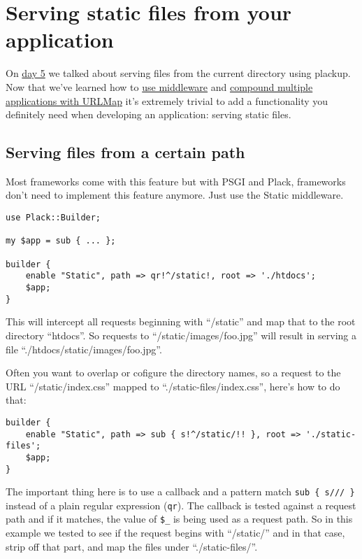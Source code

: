 \chapter{Serving static files from your
application}\label{day-17-serving-static-files-from-your-application}

On
\href{http://advent.plackperl.org/2009/12/day-5-run-a-static-file-web-server-with-plack.html}{day
5} we talked about serving files from the current directory using
plackup. Now that we've learned how to
\href{http://advent.plackperl.org/2009/12/day-10-using-plack-middleware.html}{use
middleware} and
\href{http://advent.plackperl.org/2009/12/day-12-maps-multiple-apps-with-mount-and-urlmap.html}{compound
multiple applications with URLMap} it's extremely trivial to add a
functionality you definitely need when developing an application:
serving static files.

\section{Serving files from a certain
path}\label{serving-files-from-a-certain-path}

Most frameworks come with this feature but with PSGI and Plack,
frameworks don't need to implement this feature anymore. Just use the
Static middleware.

\begin{lstlisting}
use Plack::Builder;

my $app = sub { ... };

builder {
    enable "Static", path => qr!^/static!, root => './htdocs';
    $app;
}
\end{lstlisting}

This will intercept all requests beginning with ``/static'' and map that
to the root directory ``htdocs''. So requests to
``/static/images/foo.jpg'' will result in serving a file
``./htdocs/static/images/foo.jpg''.

Often you want to overlap or cofigure the directory names, so a request
to the URL ``/static/index.css'' mapped to ``./static-files/index.css'',
here's how to do that:

\begin{lstlisting}
builder {
    enable "Static", path => sub { s!^/static/!! }, root => './static-files';
    $app;
}
\end{lstlisting}

The important thing here is to use a callback and a pattern match
\lstinline!sub { s/// }! instead of a plain regular expression
(\lstinline!qr!). The callback is tested against a request path and if
it matches, the value of \lstinline!$_! is being used as a request path.
So in this example we tested to see if the request begins with
``/static/'' and in that case, strip off that part, and map the files
under ``./static-files/''.

